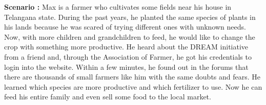 \begin{flushleft}
\textbf{Scenario :} 
Max is a farmer who cultivates some fields near his house in Telangana state. During the past years, he planted the same species of plants in his lands because he was scared of trying different ones with unknown needs. Now, with more children and grandchildren to feed, he would like to change the crop with something more productive. 
He heard about the DREAM initiative from a friend and, through the Association of Farmer, he got his credentials to login into the website.
Within a few minutes, he found out in the forums that there are thousands of small farmers like him with the same doubts and fears.
He learned which species are more productive and which fertilizer to use.
Now he can feed his entire family and even sell some food to the local market.
\end{flushleft}